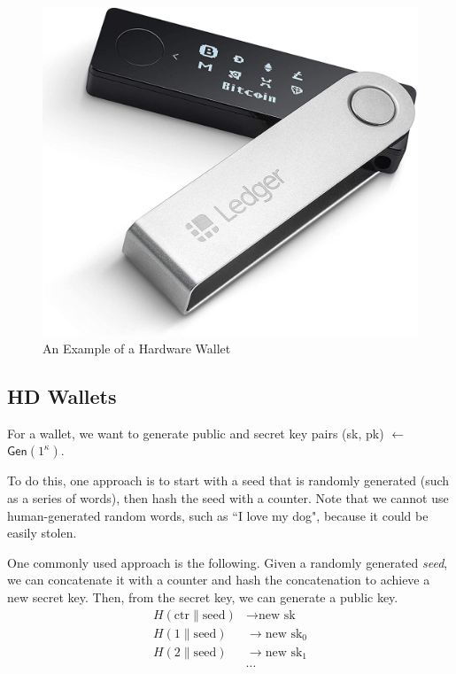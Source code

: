 \begin{figure}[ht]
    \centering
    \includegraphics[scale = 0.1]{figures/hardware_wallet.jpg}
    \caption{An Example of a Hardware Wallet\cite{hard}}
    \label{fig:hardware_wallet}
\end{figure}


\subsection{HD Wallets}
For a wallet, we want to generate public and secret key pairs (sk, pk) $\longleftarrow$ $\mathsf{Gen}(1^\kappa)$.

To do this, one approach is to start with a seed that is randomly generated (such as a series of words), then hash the seed with a counter. Note that we cannot use human-generated random words, such as ``I love my dog", because it could be easily stolen.

One commonly used approach is the following. Given a randomly generated \textit{seed}, we can concatenate it with a counter and hash the concatenation to achieve a new secret key. Then, from the secret key, we can generate a public key.
\begin{align*}
H(\text{ctr}\|\text{seed})&\longrightarrow \text{new sk} \\
H(1\|\text{seed}) &\longrightarrow \text{new sk}_0  \\
H(2\|\text{seed}) &\longrightarrow \text{new sk}_1 \\
&\cdots
\end{align*}
